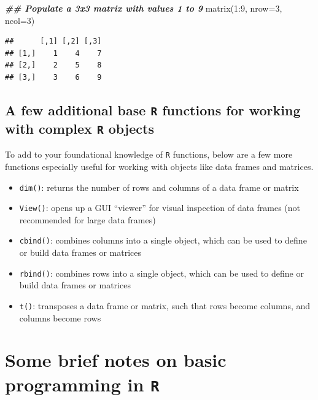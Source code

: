 \documentclass[
]{book}
\newenvironment{Shaded}{\begin{snugshade}}{\end{snugshade}}
\newcommand{\AttributeTok}[1]{\textcolor[rgb]{0.77,0.63,0.00}{#1}}
\newcommand{\DecValTok}[1]{\textcolor[rgb]{0.00,0.00,0.81}{#1}}
\newcommand{\DocumentationTok}[1]{\textcolor[rgb]{0.56,0.35,0.01}{\textbf{\textit{#1}}}}
\newcommand{\FunctionTok}[1]{\textcolor[rgb]{0.00,0.00,0.00}{#1}}
\newcommand{\NormalTok}[1]{#1}
\newcommand{\SpecialCharTok}[1]{\textcolor[rgb]{0.00,0.00,0.00}{#1}}
\begin{document}
\begin{Shaded}
\begin{Highlighting}[]
\DocumentationTok{\#\# Populate a 3x3 matrix with values 1 to 9}
\FunctionTok{matrix}\NormalTok{(}\DecValTok{1}\SpecialCharTok{:}\DecValTok{9}\NormalTok{, }\AttributeTok{nrow=}\DecValTok{3}\NormalTok{, }\AttributeTok{ncol=}\DecValTok{3}\NormalTok{)}
\end{Highlighting}
\end{Shaded}

\begin{verbatim}
##      [,1] [,2] [,3]
## [1,]    1    4    7
## [2,]    2    5    8
## [3,]    3    6    9
\end{verbatim}

\hypertarget{a-few-additional-base-r-functions-for-working-with-complex-r-objects}{%
\subsection{\texorpdfstring{A few additional base \texttt{R} functions for working with complex \texttt{R} objects}{A few additional base R functions for working with complex R objects}}\label{a-few-additional-base-r-functions-for-working-with-complex-r-objects}}

To add to your foundational knowledge of \texttt{R} functions, below are a few more functions especially useful for working with objects like data frames and matrices.

\begin{itemize}
\item
  \texttt{dim()}: returns the number of rows and columns of a data frame or matrix
\item
  \texttt{View()}: opens up a GUI ``viewer'' for visual inspection of data frames (not recommended for large data frames)
\item
  \texttt{cbind()}: combines columns into a single object, which can be used to define or build data frames or matrices
\item
  \texttt{rbind()}: combines rows into a single object, which can be used to define or build data frames or matrices
\item
  \texttt{t()}: transposes a data frame or matrix, such that rows become columns, and columns become rows
\end{itemize}

\hypertarget{some-brief-notes-on-basic-programming-in-r}{%
\section{\texorpdfstring{Some brief notes on basic programming in \texttt{R}}{Some brief notes on basic programming in R}}\label{some-brief-notes-on-basic-programming-in-r}}
\end{document}
